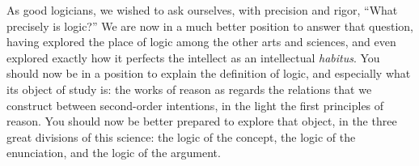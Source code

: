 \documentclass[
  12pt,
]{memoir}
\begin{document}
As good logicians, we wished to ask ourselves, with precision and rigor,
``What precisely is logic?'' We are now in a much better position to
answer that question, having explored the place of logic among the other
arts and sciences, and even explored exactly how it perfects the
intellect as an intellectual \emph{habitus}. You should now be in a
position to explain the definition of logic, and especially what its
object of study is: the works of reason as regards the relations that we
construct between second-order intentions, in the light the first
principles of reason. You should now be better prepared to explore that
object, in the three great divisions of this science: the logic of the
concept, the logic of the enunciation, and the logic of the argument.

\backmatter
\end{document}
